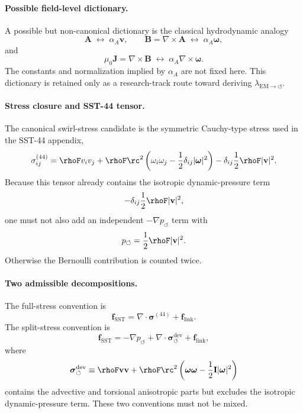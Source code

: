 \paragraph{Possible field-level dictionary.}
A possible but non-canonical dictionary is the classical hydrodynamic analogy
\[
\mathbf A
\;\longleftrightarrow\;
\alpha_A\mathbf v,
\qquad
\mathbf B=\nabla\times\mathbf A
\;\longleftrightarrow\;
\alpha_A\boldsymbol{\omega},
\]
and
\[
\mu_0\mathbf J
=
\nabla\times\mathbf B
\;\longleftrightarrow\;
\alpha_A\nabla\times\boldsymbol{\omega}.
\]
The constants and normalization implied by
\(\alpha_A\) are not fixed here.  This dictionary is retained only as a
research-track route toward deriving
\(\lambda_{\mathrm{EM}\to\circlearrowleft}\).

\paragraph{Stress closure and SST-44 tensor.}
The canonical swirl-stress candidate is the symmetric Cauchy-type stress
used in the SST-44 appendix,
\[
\sigma^{(44)}_{ij}
=
\rhoF v_i v_j
+
\rhoF \rc^2
\left(
\omega_i\omega_j-\frac12\delta_{ij}|\boldsymbol{\omega}|^2
\right)
-
\delta_{ij}\frac12\rhoF|\mathbf v|^2 .
\]
Because this tensor already contains the isotropic dynamic-pressure term
\[
-\delta_{ij}\frac12\rhoF|\mathbf v|^2,
\]
one must not also add an independent
\(-\nabla p_{\circlearrowleft}\) term with
\[
p_{\circlearrowleft}
=
\frac12\rhoF|\mathbf v|^2 .
\]
Otherwise the Bernoulli contribution is counted twice.

\paragraph{Two admissible decompositions.}
The full-stress convention is
\[
\boxed{
\mathbf f_{\mathrm{SST}}
=
\nabla\cdot\boldsymbol{\sigma}^{(44)}
+
\mathbf f_{\mathrm{link}} .
}
\]
The split-stress convention is
\[
\boxed{
\mathbf f_{\mathrm{SST}}
=
-\nabla p_{\circlearrowleft}
+
\nabla\cdot\boldsymbol{\sigma}^{\mathrm{dev}}_{\circlearrowleft}
+
\mathbf f_{\mathrm{link}},
}
\]
where
\[
\boldsymbol{\sigma}^{\mathrm{dev}}_{\circlearrowleft}
\equiv
\rhoF\mathbf v\mathbf v
+
\rhoF\rc^2
\left(
\boldsymbol{\omega}\boldsymbol{\omega}
-
\frac12\mathbf I|\boldsymbol{\omega}|^2
\right)
\]
contains the advective and torsional anisotropic parts but excludes the
isotropic dynamic-pressure term.  These two conventions must not be mixed.

